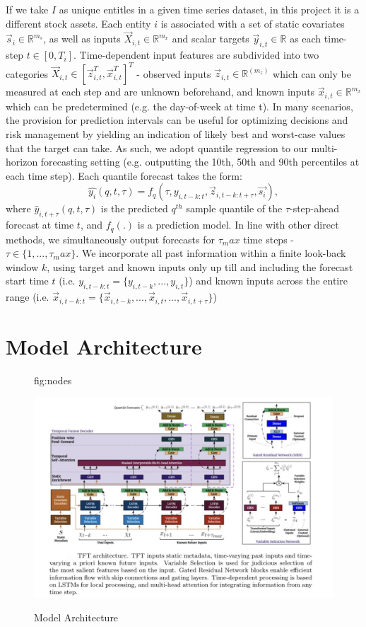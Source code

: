 \documentclass[tablecaption=bottom,nowcp]{jmlr}%
\begin{document}
If we take $I$ as unique entitles in a given time series dataset, in this project it is a different stock assets. Each entity $i$ is associated with a set of static covariates ${\vec{s}_i \in {\mathbb{R}}^{m_s}}$, as well as inputs ${\vec{X}_{i,t} \in {\mathbb{R}}^{m_x}}$ and scalar targets ${\vec{y}_{i,t} \in {\mathbb{R}}}$ as each time-step ${t \in [0,T_i]}$. Time-dependent input features are
subdivided into two categories ${\vec{X}_{i,t} \in [\vec{z}_{i,t}^T,\vec{x}_{i,t}^T]^T}$ - observed inputs
${\vec{z}_{i,t} \in {\mathbb{R}}^{(m_z)}}$ which can only be measured at each step and are unknown beforehand, and known inputs ${\vec{x}_{i,t} \in {\mathbb{R}}^{m_x}}$ which can be predetermined (e.g. the day-of-week at time t).
In many scenarios, the provision for prediction intervals can be useful for optimizing decisions and risk management by yielding an indication of likely best and worst-case values that the target can take. As such, we adopt quantile regression to our multi-horizon forecasting setting (e.g. outputting the 10th, 50th and 90th percentiles at each time step). Each quantile forecast takes the form:
\begin{equation}
\hat{y_i}(q,t,\tau) = f_q(\tau, y_{i,t-k:t}, \vec{z}_{i,t-k:t+\tau},\vec{s_i}),
\end{equation}
where $\hat{y}_{i,t+\tau}(q,t,\tau)$  is the predicted $q^{th}$ sample quantile of the $\tau$-step-ahead 
forecast at time $t$, and $f_q(.)$ is a prediction model.  In line with other direct methods, we simultaneously output forecasts for $\tau_max$ time steps - $\tau \in \{1,...,\tau_max\}$. We incorporate all past information within a finite look-back window $k$, using target and known inputs only up till and including the forecast start time $t$ (i.e. $y_{i,t-k:t}=\{y_{i,t-k},...,y_{i,t}\}$) and known inputs across the entire range (i.e. $\vec{x}_{i,t-k:t}=\{\vec{x}_{i,t-k},...,\vec{x}_{i,t},...,\vec{x}_{i,t+\tau}\}$)


\section{Model Architecture}
\label{sec:model}

\begin{figure}[htbp]
\floatconts
  {fig:nodes}
  {\caption{Model Architecture}}
  {\includegraphics[width=1\linewidth]{1.jpg}}
\end{figure}
\end{document}
